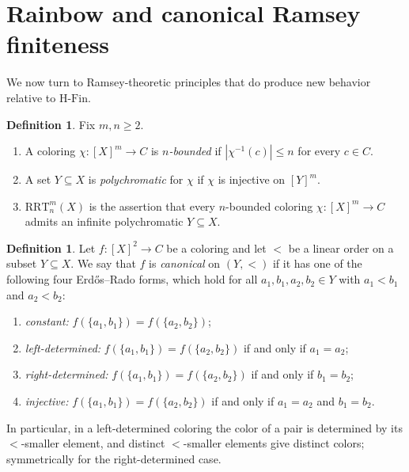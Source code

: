 \documentclass[10pt,a4paper]{amsart}
\theoremstyle{definition}
\newtheorem{definition}[theorem]{Definition}
\newcommand{\HFin}{\mathrm{H\text{-}Fin}}
\newcommand{\RRT}{\mathrm{RRT}}
\begin{document}
\section{Rainbow and canonical Ramsey finiteness}\label{sec:rainbow}

We now turn to Ramsey-theoretic principles that do produce new behavior relative to \(\HFin\).

\begin{definition}
Fix \(m,n\geq 2\).
\begin{enumerate}[label=(\arabic*)]
    \item A coloring \(\chi:[X]^m\to C\) is \emph{\(n\)-bounded} if \(|\chi^{-1}(c)|\leq n\) for every \(c\in C\).
    \item A set \(Y\subseteq X\) is \emph{polychromatic} for \(\chi\) if \(\chi\) is injective on \([Y]^m\).
    \item \(\RRT^m_n(X)\) is the assertion that every \(n\)-bounded coloring \(\chi:[X]^m\to C\) admits an infinite polychromatic \(Y\subseteq X\).
\end{enumerate}
\end{definition}

\begin{definition}\label{def:canonical-forms}
Let \(f:[X]^2\to C\) be a coloring and let \(<\) be a linear order on a subset \(Y\subseteq X\).  We say that \(f\) is \emph{canonical} on \((Y,<)\) if it has one of the following four Erd\H{o}s--Rado forms, which hold for all \(a_1,b_1,a_2,b_2\in Y\) with \(a_1<b_1\) and \(a_2<b_2\):
\begin{enumerate}[label=(\alph*)]
    \item \emph{constant:} \(f(\{a_1,b_1\})=f(\{a_2,b_2\})\);
    \item \emph{left-determined:} \(f(\{a_1,b_1\})=f(\{a_2,b_2\})\) if and only if \(a_1=a_2\);
    \item \emph{right-determined:} \(f(\{a_1,b_1\})=f(\{a_2,b_2\})\) if and only if \(b_1=b_2\);
    \item \emph{injective:} \(f(\{a_1,b_1\})=f(\{a_2,b_2\})\) if and only if \(a_1=a_2\) and \(b_1=b_2\).
\end{enumerate}
In particular, in a left-determined coloring the color of a pair is determined by its \(<\)-smaller element, and distinct \(<\)-smaller elements give distinct colors; symmetrically for the right-determined case.
\end{definition}
\end{document}
